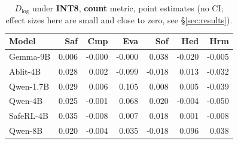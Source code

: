 \documentclass[10pt,twocolumn]{article}
\newcommand{\Dlog}{D_{\log}}
\begin{document}
\begin{table}[p]
\centering\scriptsize
\setlength{\tabcolsep}{3pt}
\caption{$\Dlog$ under \textbf{INT8}, \textbf{count} metric, point estimates (no CI; effect
sizes here are small and close to zero, see \S\ref{sec:results}).}
\label{tab:dlog-int8}
\begin{tabular}{@{}lrrrrrr@{}}
\toprule
Model & Saf & Cmp & Eva & Sof & Hed & Hrm \\
\midrule
Gemma-9B  &  0.006 & -0.000 & -0.000 &  0.038 & -0.020 & -0.005 \\
Ablit-4B  &  0.028 &  0.002 & -0.099 & -0.018 &  0.013 & -0.032 \\
Qwen-1.7B &  0.029 &  0.006 &  0.105 &  0.008 &  0.005 & -0.039 \\
Qwen-4B   &  0.025 & -0.001 &  0.068 &  0.020 & -0.004 & -0.050 \\
SafeRL-4B &  0.035 & -0.008 &  0.007 &  0.018 &  0.001 & -0.008 \\
Qwen-8B   &  0.020 & -0.004 &  0.035 & -0.018 &  0.096 &  0.038 \\
\bottomrule
\end{tabular}
\end{table}
\end{document}
